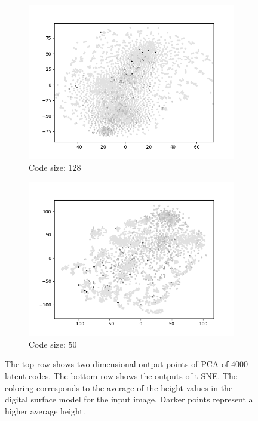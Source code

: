 \begin{figure}[H]
\begin{subfigure}{.25\textwidth}
        \includegraphics[width=\textwidth]{images/figures/experiments_latent/convolutional_dim1024_dsm.png}  
        \caption{Code size: $128$} 
    \end{subfigure}%
    \begin{subfigure}{.25\textwidth}
        \centering
        \includegraphics[width=\textwidth]{images/figures/experiments_latent/convolutional_dim50_dsm.png}
        \caption{Code size: $50$}
    \end{subfigure}
    \caption{The top row shows two dimensional output points of PCA of $4000$ latent codes. 
    The bottom row shows the outputs
    of t-SNE. The coloring corresponds to the average of the height values in the digital surface model for the
    input image. Darker points represent a higher average height.}
\end{figure}

